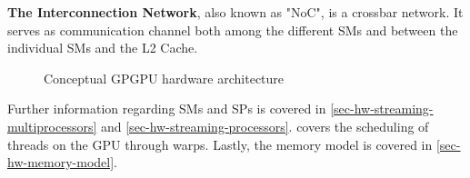 \textbf{The Interconnection Network}, also known as "NoC", is a crossbar network.
It serves as communication channel both among the different SMs and between the individual SMs and the L2 Cache.

\begin{figure}[ht]
	\centering
	\caption{Conceptual GPGPU hardware architecture}
	\label{fig:hw-gpu}
\end{figure}

Further information regarding SMs and SPs is covered in \cref{sec-hw-streaming-multiprocessors} and \cref{sec-hw-streaming-processors}.
 covers the scheduling of threads on the GPU through warps.
Lastly, the memory model is covered in \cref{sec-hw-memory-model}.